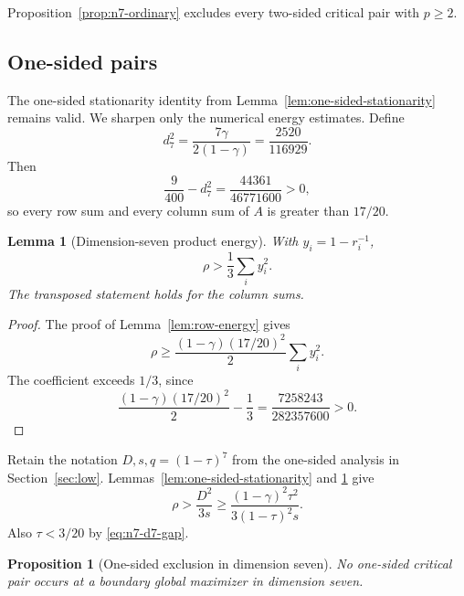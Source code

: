 \documentclass[11pt]{article}
\newtheorem{lemma}[theorem]{Lemma}
\newtheorem{proposition}[theorem]{Proposition}
\theoremstyle{definition}
\newcommand{\1}{\mathbf{1}}
\begin{document}
Proposition~\ref{prop:n7-ordinary} excludes every two-sided critical pair
with $p\ge2$.

\subsection{One-sided pairs}

The one-sided stationarity identity from
Lemma~\ref{lem:one-sided-stationarity} remains valid.  We sharpen only the
numerical energy estimates.  Define
\[
 d_7^2=\frac{7\gamma}{2(1-\gamma)}=\frac{2520}{116929}.
\]
Then
\[
 \frac9{400}-d_7^2=\frac{44361}{46771600}>0,
 \tag{8.7}\label{eq:n7-d7-gap}
\]
so every row sum and every column sum of $A$ is greater than $17/20$.

\begin{lemma}[Dimension-seven product energy]\label{lem:n7-product-energy}
With $y_i=1-r_i^{-1}$,
\[
 \rho>\frac13\sum_i y_i^2.
 \tag{8.8}\label{eq:n7-product-energy}
\]
The transposed statement holds for the column sums.
\end{lemma}

\begin{proof}
The proof of Lemma~\ref{lem:row-energy} gives
\[
 \rho\ge
 \frac{(1-\gamma)(17/20)^2}{2}\sum_i y_i^2.
\]
The coefficient exceeds $1/3$, since
\[
 \frac{(1-\gamma)(17/20)^2}{2}-\frac13
 =\frac{7258243}{282357600}>0.
\]
\end{proof}

Retain the notation $D,s,q=(1-\tau)^7$ from the one-sided analysis in
Section~\ref{sec:low}.  Lemmas~\ref{lem:one-sided-stationarity} and
\ref{lem:n7-product-energy} give
\[
 \rho>\frac{D^2}{3s}
 \ge
 \frac{(1-\gamma)^2\tau^2}{3(1-\tau)^2s}.
 \tag{8.9}\label{eq:n7-one-sided-energy}
\]
Also $\tau<3/20$ by \eqref{eq:n7-d7-gap}.

\begin{proposition}[One-sided exclusion in dimension seven]
\label{prop:n7-one-sided}
No one-sided critical pair occurs at a boundary global maximizer in dimension
seven.
\end{proposition}
\end{document}
